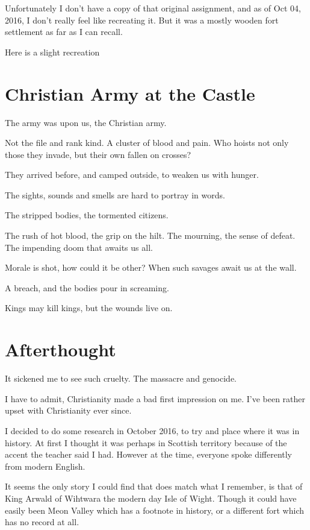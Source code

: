Unfortunately I don't have a copy of that original assignment, and as of Oct
04, 2016, I don't really feel like recreating it. But it was a mostly wooden 
fort settlement as far as I can recall. 

Here is a slight recreation

\section{Christian Army at the Castle}
The army was upon us, the Christian army.

Not the file and rank kind. A cluster of blood and pain. 
Who hoists not only those they invade, but their own fallen on crosses?

They arrived before, and camped outside, to weaken us with hunger. 

The sights, sounds and smells are hard to portray in words. 

The stripped bodies, the tormented citizens. 

The rush of hot blood, the grip on the hilt. The mourning, the sense of defeat. 
The impending doom that awaits us all. 

Morale is shot, how could it be other? When such savages await us at the wall.

A breach, and the bodies pour in screaming. 

Kings may kill kings, but the wounds live on. 
\section{Afterthought}

It sickened me to see such cruelty. The massacre and genocide. 

I have to admit, Christianity made a bad first impression on me. 
I've been rather upset with Christianity ever since. 

I decided to do some research in October 2016, to try and place where it was in
history. At first I thought it was perhaps in Scottish territory because of the
accent the teacher said I had. However at the time, everyone spoke differently
from modern English. 

It seems the only story I could find that does match what I remember, is that of
King Arwald of Wihtwara the modern day Isle of Wight.  
Though it could have easily been Meon Valley which has a footnote in history, 
or a different fort which has no record at all. 

